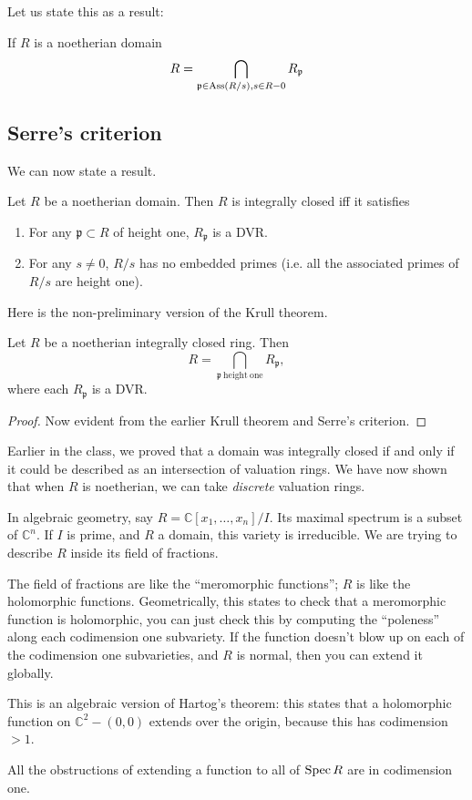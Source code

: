 Let us state this as a result:
\begin{theorem}
If $R$ is a noetherian domain
\[ R = \bigcap_{\mathfrak{p} \in \operatorname{Ass}(R/s), s \in R - 0}
R_{\mathfrak{p}}  \]
\end{theorem}

\subsection{Serre's criterion}

We can now state a result.
\begin{theorem}[Serre] Let $R$ be a noetherian domain.	Then $R $ is integrally
closed iff it satisfies
\begin{enumerate}
\item For any $\mathfrak{p} \subset R$ of height one, $R_{\mathfrak{p}}$ is a
DVR.
\item For any $s \neq 0$, $R/s$ has no embedded primes (i.e. all the
associated primes of $R/s$ are height one).
\end{enumerate}
\end{theorem}

Here is the non-preliminary version of the Krull theorem.
\begin{theorem}[Krull]
Let $R$ be a noetherian integrally closed ring. Then
\[ R = \bigcap_{\mathfrak{p} \ \mathrm{height \ one}} R_{\mathfrak{p}},  \]
where each $R_{\mathfrak{p}}$ is a DVR.
\end{theorem}

\begin{proof}
Now evident from the earlier Krull theorem and Serre's criterion.
\end{proof}
Earlier in the class, we proved that a domain was integrally closed if and only
if it could be described as an intersection of valuation rings. We have now
shown that when $R$ is noetherian, we can take \emph{discrete} valuation rings.

\begin{remark}
In algebraic geometry, say $R = \mathbb{C}[x_1, \dots, x_n]/I$.  Its maximal
spectrum is a subset of $\mathbb{C}^n$.  If $I$ is prime, and $R$ a domain,
this variety is
irreducible.  We are trying to describe $R$ inside its field of fractions.

The field of fractions are like the ``meromorphic functions''; $R$ is like the
holomorphic functions. Geometrically, this states to check that a meromorphic
function is holomorphic, you can just check this by computing the ``poleness''
along each codimension one subvariety. If the function doesn't blow up on each
of the codimension one subvarieties,  and $R$ is normal, then you can extend it
globally.

This is an algebraic version of Hartog's theorem: this states that a
holomorphic function on $\mathbb{C}^2 - (0,0)$ extends over the origin, because
this has codimension $>1$.

All the obstructions of extending a function to all of $\operatorname{Spec} R$ are in
codimension one.
\end{remark}

